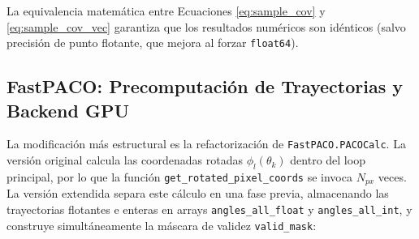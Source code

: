 \begin{algorithm}[H]
\caption{Covarianza muestral $\hat{S}$ -- versión extendida (vectorizada)}
\label{alg:scov_nuevo}
\end{algorithm}

La equivalencia matemática entre Ecuaciones \ref{eq:sample_cov} y \ref{eq:sample_cov_vec} garantiza que los resultados numéricos son idénticos (salvo precisión de punto flotante, que mejora al forzar \texttt{float64}).

\subsection{FastPACO: Precomputación de Trayectorias y Backend GPU}

La modificación más estructural es la refactorización de \texttt{FastPACO.PACOCalc}. La versión original calcula las coordenadas rotadas $\phi_l(\theta_k)$ dentro del loop principal, por lo que la función \texttt{get\_rotated\_pixel\_coords} se invoca $N_{px}$ veces. La versión extendida separa este cálculo en una fase previa, almacenando las trayectorias flotantes e enteras en arrays \texttt{angles\_all\_float} y \texttt{angles\_all\_int}, y construye simultáneamente la máscara de validez \texttt{valid\_mask}:

\begin{algorithm}[H]
\caption{FastPACO -- precomputación de trayectorias (versión extendida)}
\label{alg:fastpaco_precomp}
\end{algorithm}

